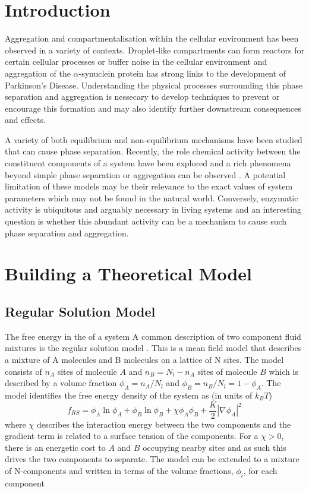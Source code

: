 \section{\label{sec:intro}Introduction}
Aggregation and compartmentalisation within the cellular environment has been observed in a variety of contexts\cite{weber_drops_2021}. Droplet-like compartments can form reactors for certain cellular processes\cite{nott_phase_2015} or buffer noise in the cellular environment\cite{klosin_phase_2020} and aggregation of the $\alpha$-synuclein protein has strong links to the development of Parkinson's Disease\cite{tong_loss_2010}. Understanding the physical processes surrounding this phase separation and aggregation is nessecary to develop techniques to prevent or encourage this formation and may also identify further downstream consequences and effects.

A variety of both equilibrium and non-equilibrium mechanisms have been studied that can cause phase separation\cite{li_non-equilibrium_2020,weber_drops_2021}. Recently, the role chemical activity between the constituent components of a system have been explored and a rich phenomena beyond simple phase separation or aggregation can be observed \cite{agudo-canalejo_active_2019}. A potential limitation of these models may be their relevance to the exact values of system parameters which may not be found in the natural world. Conversely, enzymatic activity is ubiquitous and arguably necessary in living systems and an interesting question is whether this abundant activity can be a mechanism to cause such phase separation and aggregation.

\section{Building a Theoretical Model}
\subsection{\label{sec:rs_theory}Regular Solution Model}
The free energy in the of a system A common description of two component fluid mixtures is the regular solution model \cite{jones2002soft}. This is a mean field model that describes a mixture of A molecules and B molecules on a lattice of N sites. The model consists of $n_A$ sites of molecule $A$ and $n_B=N_l-n_A$ sites of molecule $B$ which is described by a volume fraction $\phi_A = n_A/N_l$ and $\phi_B = n_B/N_l = 1-\phi_A$. The model identifies the free energy density of the system as (in units of $k_BT$)
\begin{equation}
    f_{RS} = \phi_A\ln\phi_A+\phi_B\ln\phi_B + \chi\phi_A\phi_B + \frac{K}{2}|\nabla\phi_A|^2
\end{equation}
where $\chi$ describes the interaction energy between the two components and the gradient term is related to a surface tension of the components. For a $\chi > 0$, there is an energetic cost to $A$ and $B$ occupying nearby sites and as such this drives the two components to separate. The model can be extended to a mixture of N-components and written in terms of the volume fractions, $\phi_i$, for each component

